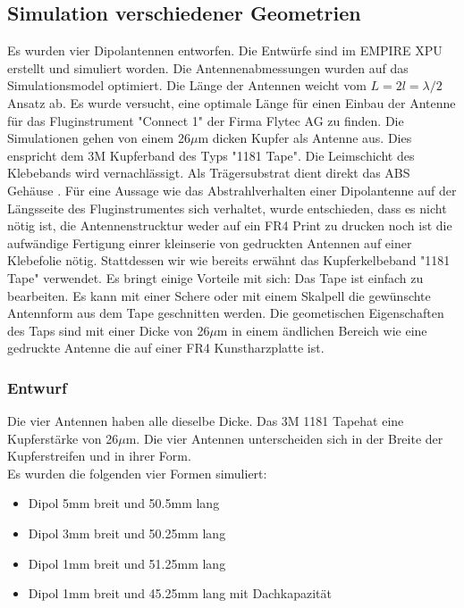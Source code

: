 \subsection{Simulation  verschiedener Geometrien}
Es wurden vier Dipolantennen entworfen. Die Entwürfe sind im EMPIRE XPU erstellt und simuliert worden. Die Antennenabmessungen wurden auf das Simulationsmodel optimiert. Die Länge der Antennen weicht vom $L=2l=\lambda/2$ Ansatz ab. Es wurde versucht, eine optimale Länge für einen Einbau der Antenne für das Fluginstrument  "Connect 1" der Firma Flytec AG zu finden. Die Simulationen gehen von einem 26$\mu$m dicken Kupfer als Antenne aus. Dies enspricht dem 3M Kupferband des Typs "1181 Tape". Die Leimschicht des Klebebands wird vernachlässigt. Als Trägersubstrat dient direkt das ABS Gehäuse \cite{Kupferband}. Für eine Aussage wie das Abstrahlverhalten einer Dipolantenne auf der Längsseite des Fluginstrumentes sich verhaltet, wurde entschieden, dass es nicht nötig ist, die Antennenstrucktur  weder auf ein FR4 Print zu drucken noch ist die aufwändige Fertigung einrer kleinserie von gedruckten Antennen auf einer Klebefolie nötig. Stattdessen wir wie bereits erwähnt das Kupferkelbeband "1181 Tape" verwendet. Es bringt einige Vorteile mit sich: Das Tape ist einfach zu bearbeiten. Es kann mit einer Schere oder mit einem Skalpell die gewünschte Antennform aus dem Tape geschnitten werden. Die geometischen Eigenschaften des Taps sind mit einer Dicke von 26$\mu$m in einem ändlichen Bereich wie eine gedruckte Antenne die auf einer FR4 Kunstharzplatte ist.
\newpage
\subsubsection*{Entwurf}
Die vier Antennen haben alle dieselbe Dicke. Das \glqq 3M 1181 Tape\grqq   hat eine Kupferstärke von 26$\mu$m. Die vier Antennen unterscheiden sich in der Breite der Kupferstreifen und in ihrer Form.\\
Es wurden die folgenden vier Formen simuliert:

\begin{itemize}
\item Dipol 5mm breit und 50.5mm lang
\item Dipol 3mm breit und 50.25mm lang
\item Dipol 1mm breit und 51.25mm lang
\item Dipol 1mm breit und 45.25mm lang mit Dachkapazität
\end{itemize}

